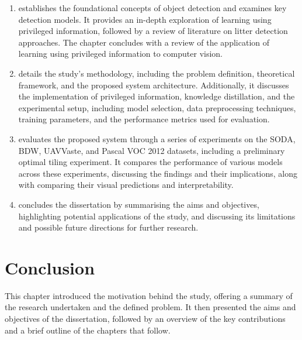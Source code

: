 \begin{enumerate}[label=\textbf{Chapter \arabic*}, leftmargin=*, start=2]
    

    \item establishes the foundational concepts of object detection and examines key detection models. It provides an in-depth exploration of learning using privileged information, followed by a review of literature on litter detection approaches. The chapter concludes with a review of the application of learning using privileged information to computer vision.
    
    \item details the study's methodology, including the problem definition, theoretical framework, and the proposed system architecture. Additionally, it discusses the implementation of privileged information, knowledge distillation, and the experimental setup, including model selection, data preprocessing techniques, training parameters, and the performance metrics used for evaluation.
    
    \item evaluates the proposed system through a series of experiments on the SODA, BDW, UAVVaste, and Pascal VOC 2012 datasets, including a preliminary optimal tiling experiment. It compares the performance of various models across these experiments, discussing the findings and their implications, along with comparing their visual predictions and interpretability.
    

    \item concludes the dissertation by summarising the aims and objectives, highlighting potential applications of the study, and discussing its limitations and possible future directions for further research.
\end{enumerate}

\section{Conclusion}
\label{sec:conclusion_intro}

This chapter introduced the motivation behind the study, offering a summary of the research undertaken and the defined problem. It then presented the aims and objectives of the dissertation, followed by an overview of the key contributions and a brief outline of the chapters that follow.
